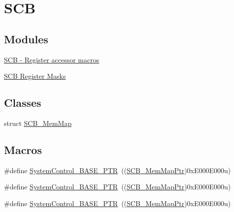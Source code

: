 \hypertarget{group___s_c_b___peripheral}{}\section{S\+CB}
\label{group___s_c_b___peripheral}
\subsection*{Modules}
\begin{DoxyCompactItemize}
\item 
\hyperlink{group___s_c_b___register___accessor___macros}{S\+C\+B -\/ Register accessor macros}
\item 
\hyperlink{group___s_c_b___register___masks}{S\+C\+B Register Masks}
\end{DoxyCompactItemize}
\subsection*{Classes}
\begin{DoxyCompactItemize}
\item 
struct \hyperlink{struct_s_c_b___mem_map}{S\+C\+B\+\_\+\+Mem\+Map}
\end{DoxyCompactItemize}
\subsection*{Macros}
\begin{DoxyCompactItemize}
\item 
\#define \hyperlink{group___s_c_b___peripheral_gaf22864785770f832103e904244e078cb}{System\+Control\+\_\+\+B\+A\+S\+E\+\_\+\+P\+TR}~((\hyperlink{group___s_c_b___peripheral_ga08aca299c99cac47121d9e64e7b8e1cf}{S\+C\+B\+\_\+\+Mem\+Map\+Ptr})0x\+E000\+E000u)
\item 
\#define \hyperlink{group___s_c_b___peripheral_gaf22864785770f832103e904244e078cb}{System\+Control\+\_\+\+B\+A\+S\+E\+\_\+\+P\+TR}~((\hyperlink{group___s_c_b___peripheral_ga08aca299c99cac47121d9e64e7b8e1cf}{S\+C\+B\+\_\+\+Mem\+Map\+Ptr})0x\+E000\+E000u)
\item 
\#define \hyperlink{group___s_c_b___peripheral_gaf22864785770f832103e904244e078cb}{System\+Control\+\_\+\+B\+A\+S\+E\+\_\+\+P\+TR}~((\hyperlink{group___s_c_b___peripheral_ga08aca299c99cac47121d9e64e7b8e1cf}{S\+C\+B\+\_\+\+Mem\+Map\+Ptr})0x\+E000\+E000u)
\end{DoxyCompactItemize}
